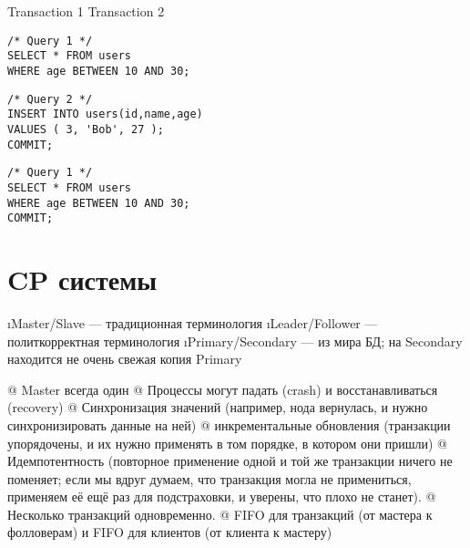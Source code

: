 \begin{minipage}{.45\linewidth}
\hfil Transaction 1 \hfil   \hfil Transaction 2 \hfil
\begin{flushleft}\begin{minipage}{.6\textwidth}
\begin{verbatim}
/* Query 1 */
SELECT * FROM users
WHERE age BETWEEN 10 AND 30;
\end{verbatim}
\end{minipage}\end{flushleft}

\begin{flushright}\begin{minipage}{.6\textwidth}
\begin{verbatim}
/* Query 2 */
INSERT INTO users(id,name,age)
VALUES ( 3, 'Bob', 27 );
COMMIT;
\end{verbatim}
\end{minipage}
\end{flushright}

\begin{flushleft}\begin{minipage}{.6\textwidth}
\begin{verbatim}
/* Query 1 */
SELECT * FROM users
WHERE age BETWEEN 10 AND 30;
COMMIT;
\end{verbatim}
\end{minipage}\end{flushleft}
\end{minipage}
    
\section{CP системы}

\begin{enumerate}
\i Master/Slave --- традиционная терминология
\i Leader/Follower --- политкорректная терминология
\i Primary/Secondary --- из мира БД; на Secondary находится не очень свежая копия Primary
\end{enumerate}

\begin{el}[ol]
@ Master всегда один
@ Процессы могут падать (crash) и восстанавливаться (recovery)
@ Синхронизация значений (например, нода вернулась, и нужно синхронизировать данные на ней)
@ инкрементальные обновления (транзакции упорядочены, и их нужно применять в том порядке, в котором они пришли)
@ Идемпотентность (повторное применение одной и той же транзакции ничего не поменяет; если мы вдруг думаем, что транзакция могла не примениться, применяем её ещё раз для подстраховки, и уверены, что плохо не станет).
@ Несколько транзакций одновременно.
@ FIFO для транзакций (от мастера к фолловерам) и FIFO для клиентов (от клиента к мастеру)
\end{el}

